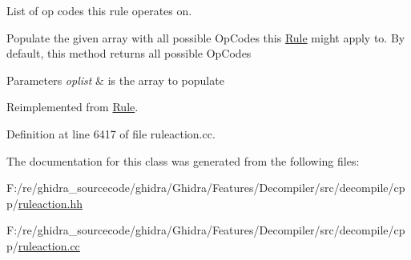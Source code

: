 List of op codes this rule operates on. 

Populate the given array with all possible Op\+Codes this \mbox{\hyperlink{class_rule}{Rule}} might apply to. By default, this method returns all possible Op\+Codes 
\begin{DoxyParams}{Parameters}
{\em oplist} & is the array to populate \\
\hline
\end{DoxyParams}


Reimplemented from \mbox{\hyperlink{class_rule_a4023bfc7825de0ab866790551856d10e}{Rule}}.



Definition at line 6417 of file ruleaction.\+cc.



The documentation for this class was generated from the following files\+:\begin{DoxyCompactItemize}
\item 
F\+:/re/ghidra\+\_\+sourcecode/ghidra/\+Ghidra/\+Features/\+Decompiler/src/decompile/cpp/\mbox{\hyperlink{ruleaction_8hh}{ruleaction.\+hh}}\item 
F\+:/re/ghidra\+\_\+sourcecode/ghidra/\+Ghidra/\+Features/\+Decompiler/src/decompile/cpp/\mbox{\hyperlink{ruleaction_8cc}{ruleaction.\+cc}}\end{DoxyCompactItemize}
